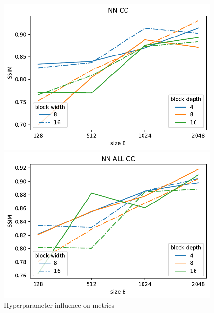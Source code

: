 \begin{figure}
{\begin{minipage}{0.6\textwidth}
    \includegraphics[width=\textwidth]{figures/comparison_CIFAR10_SSIM_NN_CC.pdf}
    \end{minipage}%
    \begin{minipage}{0.6\textwidth}
    \includegraphics[width=\textwidth]{figures/comparison_CIFAR10_SSIM_NN_ALL_CC.pdf}
    \end{minipage}
    }
    \caption{Hyperparameter influence on metrics}
    \label{fig:HyperparamInfluence}
\end{figure}



